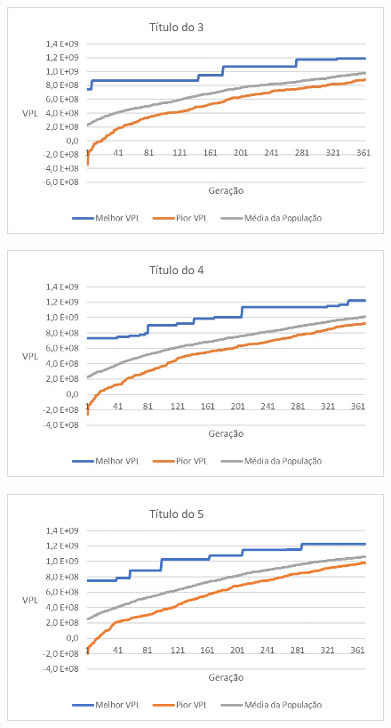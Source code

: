 \documentclass[12pt,a4paper]{report}
\begin{document}
\begin{figure}[H]
\centering

\includegraphics[scale=1]{ApD/3}

\end{figure}

\begin{figure}[H]
\centering

\includegraphics[scale=1]{ApD/4}

\end{figure}


\begin{figure}[H]
\centering

\includegraphics[scale=1]{ApD/5}

\end{figure}
\end{document}
